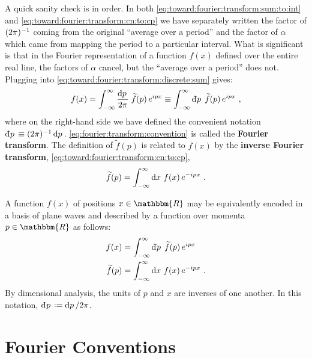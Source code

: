 A quick sanity check is in order. In both \eqref{eq:toward:fourier:transform:sum:to:int} and \eqref{eq:toward:fourier:transform:cn:to:cp} we have separately written the factor of $(2\pi)^{-1}$ coming from the original ``average over a period'' and the factor of $\alpha$ which came from mapping the period to a particular interval. What is significant is that in the Fourier representation of a function $f(x)$ defined over the entire real line, the factors of $\alpha$ cancel, but the ``average over a period'' does not. Plugging into \eqref{eq:toward:fourier:transform:discrete:sum} gives:
\begin{align}
    f(x) = \int_{-\infty}^\infty \frac{\D{p}}{2\pi}\; 
    \tilde f(p)\,
    e^{ipx} 
    \equiv 
    \int_{-\infty}^\infty \Dbar{p}\; 
    \tilde f(p)\,
    e^{ipx} 
    \ ,
\end{align}
where on the right-hand side we have defined the convenient notation $\Dbar{p} \equiv (2\pi)\inv \D{p}$. \eqref{eq:fourier:transform:convention} is called the \textbf{Fourier transform}. The definition of $\tilde f(p)$ is related to $f(x)$ by the \textbf{inverse Fourier transform}, \eqref{eq:toward:fourier:transform:cn:to:cp},
\begin{align}
    \widetilde f(p) = 
    \int_{-\infty}^\infty \operatorname{d}\mkern-3mu^{}\mkern-1mu{x}\,\, f(x)\, e^{-ipx} 
    \ .
\end{align}


\begin{newrule}\label{rule:Fourier:transform:standard}
A function $f(x)$ of positions $x\in \mathbbm{R}$ may be equivalently encoded in a basis of plane waves and described by a function over momenta $p\in \mathbbm{R}$ as follows:
\begin{align}
    f(x) &= 
    \int_{-\infty}^\infty \Dbar{p}\; 
    \tilde f(p)\,
    e^{ipx} 
    \label{eq:fourier:transform:convention}
\\
    \tilde f(p) &= 
    \int_{-\infty}^\infty \D{x}\, f(x)\, e^{-ipx} 
    \ .
    \label{eq:fourier:inverse:transform:convention}
\end{align}
By dimensional analysis, the units of $p$ and $x$ are inverses of one another. In this notation, $\Dbar{p}\defeq \D{p}/2\pi$.
\end{newrule}

\section{Fourier Conventions}

